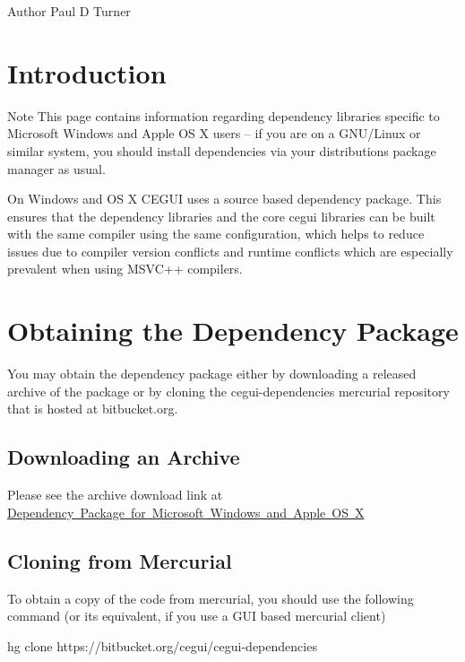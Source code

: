 \begin{DoxyAuthor}{Author}
Paul D Turner
\end{DoxyAuthor}
\hypertarget{building_deps_building_deps_intro}{}\section{Introduction}\label{building_deps_building_deps_intro}
\begin{DoxyNote}{Note}
This page contains information regarding dependency libraries specific to Microsoft Windows and Apple OS X users -- if you are on a G\+N\+U/\+Linux or similar system, you should install dependencies via your distribution\textquotesingle{}s package manager as usual.
\end{DoxyNote}
On Windows and OS X C\+E\+G\+UI uses a source based dependency package. This ensures that the dependency libraries and the core cegui libraries can be built with the same compiler using the same configuration, which helps to reduce issues due to compiler version conflicts and runtime conflicts which are especially prevalent when using M\+S\+V\+C++ compilers.\hypertarget{building_deps_building_deps_download}{}\section{Obtaining the Dependency Package}\label{building_deps_building_deps_download}
You may obtain the dependency package either by downloading a released archive of the package or by cloning the cegui-\/dependencies mercurial repository that is hosted at bitbucket.\+org. \hypertarget{building_deps_building_deps_download_archive}{}\subsection{Downloading an Archive}\label{building_deps_building_deps_download_archive}
Please see the archive download link at \mbox{\hyperlink{downloading_dl_deps}{Dependency Package for Microsoft Windows and Apple OS X}} \hypertarget{building_deps_building_deps_download_clone}{}\subsection{Cloning from Mercurial}\label{building_deps_building_deps_download_clone}
To obtain a copy of the code from mercurial, you should use the following command (or its equivalent, if you use a G\+UI based mercurial client) \begin{DoxyVerb}hg clone https://bitbucket.org/cegui/cegui-dependencies
\end{DoxyVerb}


